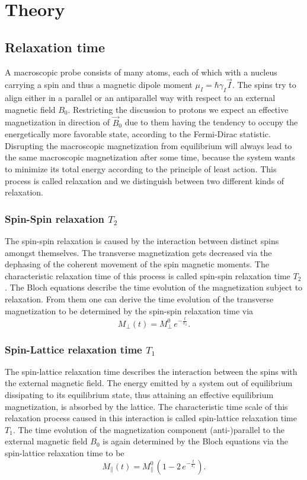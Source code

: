 \section{Theory}
\subsection{Relaxation time}
A macroscopic probe consists of many atoms, each of which with a nucleus carrying a spin and thus a magnetic dipole moment $\mu _I = \hbar \gamma _I \vec{I}$. The spins try to align either in a parallel or an antiparallel way with respect to an external magnetic field $B_0$. Restricting the discussion to protons we expect an effective magnetization in direction of $\vec{B}_0$ due to them having the tendency to occupy the energetically more favorable state, according to the Fermi-Dirac statistic. Disrupting the macroscopic magnetization from equilibrium will always lead to the same macroscopic magnetization after some time, because the system wants to minimize its total energy according to the principle of least action. This process is called relaxation and we distinguish between two different kinds of relaxation.\cite{manual} \cite{MRI}

\subsubsection{Spin-Spin relaxation $T_2$}
The spin-spin relaxation is caused by the interaction between distinct spins amongst themselves. The transverse magnetization gets decreased via the dephasing of the coherent movement of the spin magnetic moments. The characteristic relaxation time of this process is called spin-spin relaxation time $T_2$.
The Bloch equations describe the time evolution of the magnetization subject to relaxation. From them one can derive the time evolution of the transverse magnetization to be determined by the spin-spin relaxation time via \cite{manual}
\begin{equation}
	M_{\perp} (t) = M^0 _{\perp}\, e^{-\frac{t}{T_2}}\mathrm{.}
	\label{eq:1}
\end{equation}
\subsubsection{Spin-Lattice relaxation time $T_1$}
 The spin-lattice relaxation time describes the interaction between the spins with the external magnetic field. The energy emitted by a system out of equilibrium dissipating to its equilibrium state, thus attaining an effective equilibrium magnetization, is absorbed by the lattice. The characteristic time scale of this relaxation process caused in this interaction is called spin-lattice relaxation time $T_1$. The time evolution of the magnetization component (anti-)parallel to the external magnetic field $B_0$ is again determined by the Bloch equations via the spin-lattice relaxation time to be \cite{manual} \cite{MRI}
 \begin{equation}
 	M_{\parallel}(t) = M^0 _{\parallel} \, \left(1-2\, e^{-\frac{t}{T_1}}\right)\mathrm{.}
 	\label{eq:2}
 \end{equation}

